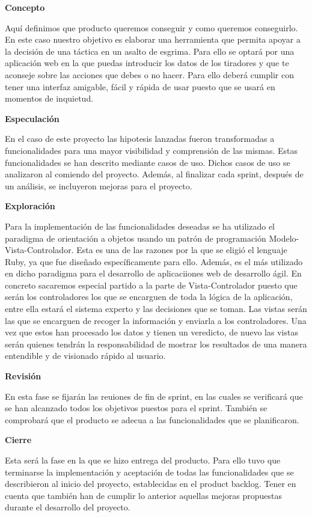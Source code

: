 \textbf{Concepto}

Aquí definimos que producto queremos conseguir y como queremos conseguirlo. En este caso
 nuestro objetivo es elaborar una herramienta que permita apoyar a la decisión de una táctica
 en un asalto de esgrima. Para ello se optará por una aplicación web en la que puedas
 introducir los datos de los tiradores y que te aconseje sobre las acciones que debes o no
 hacer. Para ello deberá cumplir con tener una interfaz amigable, fácil y rápida de usar puesto
 que se usará en momentos de inquietud.

\textbf{Especulación}

En el caso de este proyecto las hipotesis lanzadas fueron transformadas a funcionalidades
 para una mayor visibilidad y comprensión de las mismas. Estas funcionalidades se han descrito
 mediante casos de uso. Dichos casos de uso se analizaron al comiendo del proyecto. Además, al
 finalizar cada sprint, después de un análisis, se incluyeron mejoras para el proyecto.

\textbf{Exploración}

Para la implementación de las funcionalidades deseadas se ha utilizado el paradigma de orientación a objetos
 usando un patrón de programación Modelo-Vista-Controlador. Esta es una de las
 razones por la que se eligió el lenguaje Ruby, ya que
 fue diseñado específicamente para ello. Además, es el más utilizado en dicho paradigma para el
 desarrollo de aplicaciiones web de desarrollo ágil. En concreto sacaremos especial partido
 a la parte de Vista-Controlador puesto que serán los controladores los que se encarguen de
 toda la lógica de la aplicación, entre ella estará el sistema experto y las decisiones que se toman.
 Las vistas serán las que se encarguen de recoger la información y enviarla a los controladores.
 Una vez que estos han procesado los datos y tienen un veredicto, de nuevo las vistas serán
 quienes tendrán la responsabilidad de mostrar los resultados de una manera entendible y
 de visionado rápido al usuario.

\textbf{Revisión}

En esta fase se fijarán las reuiones de fin de sprint, en las cuales se verificará que se
 han alcanzado todos los objetivos puestos para el sprint. También se comprobará que el producto
 se adecua a las funcionalidades que se planificaron.

\textbf{Cierre}

Esta será la fase en la que se hizo entrega del producto. Para ello tuvo que terminarse
 la implementación y aceptación de todas las funcionalidades que se describieron al inicio
 del proyecto, establecidas en el product backlog. Tener en cuenta que también han de cumplir
 lo anterior aquellas mejoras propuestas durante el desarrollo del proyecto.

